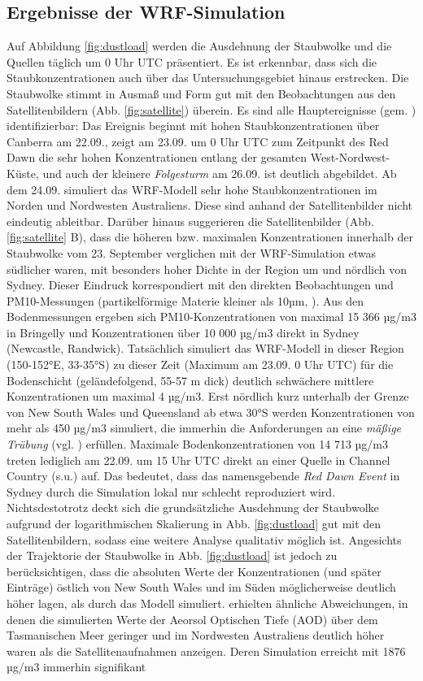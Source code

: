 \documentclass[12pt,a4paper,onecolumn]{scrartcl}
\begin{document}
\subsection{Ergebnisse der WRF-Simulation} \label{sec:wrf_results}
Auf Abbildung \ref{fig:dustload} werden die Ausdehnung der Staubwolke und die Quellen täglich um 0 Uhr UTC präsentiert. Es ist erkennbar, dass sich die Staubkonzentrationen auch über das Untersuchungsgebiet hinaus erstrecken. Die Staubwolke stimmt in Ausmaß und Form gut mit den Beobachtungen aus den Satellitenbildern (Abb. \ref{fig:satellite}) überein. Es sind alle Hauptereignisse (gem. \cite{Leys.2009}) identifizierbar: Das Ereignis beginnt mit hohen Staubkonzentrationen über Canberra am 22.09., zeigt am 23.09. um 0 Uhr UTC zum Zeitpunkt des Red Dawn die sehr hohen Konzentrationen entlang der gesamten West-Nordwest-Küste, und auch der kleinere \textit{Folgesturm} am 26.09. ist deutlich abgebildet. Ab dem 24.09. simuliert das WRF-Modell sehr hohe Staubkonzentrationen im Norden und Nordwesten Australiens. Diese sind anhand der Satellitenbilder nicht eindeutig ableitbar. Darüber hinaus suggerieren die Satellitenbilder (Abb. \ref{fig:satellite} B), dass die höheren bzw. maximalen Konzentrationen innerhalb der Staubwolke vom 23. September verglichen mit der WRF-Simulation etwas südlicher waren, mit besonders hoher Dichte in der Region um und nördlich von Sydney. Dieser Eindruck korrespondiert mit den direkten Beobachtungen und PM10-Messungen (partikelförmige Materie kleiner als 10µm, \cite{Leys.2011}). Aus den Bodenmessungen ergeben sich PM10-Konzentrationen von maximal 15 366 µg/m3 in Bringelly und Konzentrationen über 10 000 µg/m3 direkt in Sydney (Newcastle, Randwick). Tatsächlich simuliert das WRF-Modell in dieser Region (150-152°E, 33-35°S) zu dieser Zeit (Maximum am 23.09. 0 Uhr UTC) für die Bodenschicht (geländefolgend, 55-57 m dick) deutlich schwächere mittlere Konzentrationen um maximal 4 µg/m3. Erst nördlich kurz unterhalb der Grenze von New South Wales und Queensland ab etwa 30°S werden Konzentrationen von mehr als 450 µg/m3 simuliert, die immerhin die Anforderungen an eine \textit{mäßige Trübung} (vgl. \cite{Leys.2011}) erfüllen. Maximale Bodenkonzentrationen von 14 713 µg/m3 treten lediglich am 22.09. um 15 Uhr UTC direkt an einer Quelle in Channel Country (s.u.) auf. Das bedeutet, dass das namensgebende \textit{Red Dawn Event} in Sydney durch die Simulation lokal nur schlecht reproduziert wird. Nichtsdestotrotz deckt sich die grundsätzliche Ausdehnung der Staubwolke aufgrund der logarithmischen Skalierung in Abb. \ref{fig:dustload} gut mit den Satellitenbildern, sodass eine weitere Analyse qualitativ möglich ist. Angesichts der Trajektorie der Staubwolke in Abb. \ref{fig:dustload} ist jedoch zu berücksichtigen, dass die absoluten Werte der Konzentrationen (und später Einträge) östlich von New South Wales und im Süden möglicherweise deutlich höher lagen, als durch das Modell simuliert. \citet{AlizadehChoobari.2012} erhielten ähnliche Abweichungen, in denen die simulierten Werte der Aeorsol Optischen Tiefe (AOD) über dem Tasmanischen Meer geringer und im Nordwesten Australiens deutlich höher waren als die Satellitenaufnahmen anzeigen. Deren Simulation erreicht mit 1876 µg/m3 immerhin signifikant 
\end{document}
